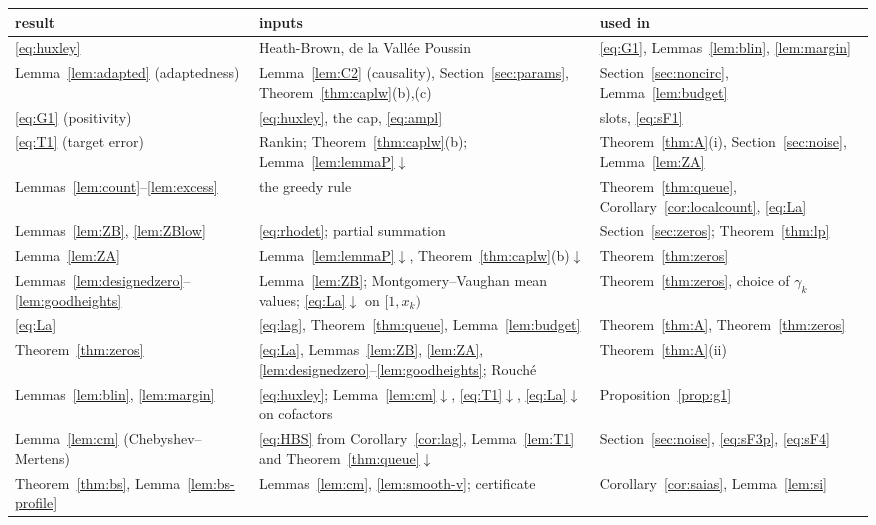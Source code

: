 \begin{center}\footnotesize
\begin{tabular}{@{}p{4.4cm}p{6.6cm}p{3.5cm}@{}}
\hline
result & inputs & used in \\ \hline
\eqref{eq:huxley} & Heath-Brown, de la Vall\'ee Poussin & \eqref{eq:G1}, Lemmas~\ref{lem:blin}, \ref{lem:margin} \\
Lemma~\ref{lem:adapted} (adaptedness) & Lemma~\ref{lem:C2} (causality), Section~\ref{sec:params}, Theorem~\ref{thm:caplw}(b),(c) & Section~\ref{sec:noncirc}, Lemma~\ref{lem:budget} \\
\eqref{eq:G1} (positivity) & \eqref{eq:huxley}, the cap, \eqref{eq:ampl} & slots, \ref{eq:sF1} \\
\eqref{eq:T1} (target error) & Rankin; Theorem~\ref{thm:caplw}(b); Lemma~\ref{lem:lemmaP}$\downarrow$ & Theorem~\ref{thm:A}(i), Section~\ref{sec:noise}, Lemma~\ref{lem:ZA} \\
Lemmas~\ref{lem:count}--\ref{lem:excess} & the greedy rule & Theorem~\ref{thm:queue}, Corollary~\ref{cor:localcount}, \eqref{eq:La} \\
Lemmas~\ref{lem:ZB}, \ref{lem:ZBlow} & \eqref{eq:rhodet}; partial summation & Section~\ref{sec:zeros}; Theorem~\ref{thm:lp} \\
Lemma~\ref{lem:ZA} & Lemma~\ref{lem:lemmaP}$\downarrow$, Theorem~\ref{thm:caplw}(b)$\downarrow$ & Theorem~\ref{thm:zeros} \\
Lemmas~\ref{lem:designedzero}--\ref{lem:goodheights} & Lemma~\ref{lem:ZB}; Montgomery--Vaughan mean values; \eqref{eq:La}$\downarrow$ on $[1,x_k)$ & Theorem~\ref{thm:zeros}, choice of $\gamma_k$ \\
\eqref{eq:La} & \eqref{eq:lag}, Theorem~\ref{thm:queue}, Lemma~\ref{lem:budget} & Theorem~\ref{thm:A}, Theorem~\ref{thm:zeros} \\
Theorem~\ref{thm:zeros} & \eqref{eq:La}, Lemmas~\ref{lem:ZB}, \ref{lem:ZA}, \ref{lem:designedzero}--\ref{lem:goodheights}; Rouch\'e & Theorem~\ref{thm:A}(ii) \\
Lemmas~\ref{lem:blin}, \ref{lem:margin} & \eqref{eq:huxley}; Lemma~\ref{lem:cm}$\downarrow$, \eqref{eq:T1}$\downarrow$, \eqref{eq:La}$\downarrow$ on cofactors & Proposition~\ref{prop:g1} \\
Lemma~\ref{lem:cm} (Chebyshev--Mertens) & \eqref{eq:HBS} from Corollary~\ref{cor:lag}, Lemma~\ref{lem:T1} and Theorem~\ref{thm:queue}$\downarrow$ & Section~\ref{sec:noise}, \ref{eq:sF3p}, \ref{eq:sF4} \\
Theorem~\ref{thm:bs}, Lemma~\ref{lem:bs-profile} & Lemmas~\ref{lem:cm}, \ref{lem:smooth-v}; certificate & Corollary~\ref{cor:saias}, Lemma~\ref{lem:si} \\

\end{tabular}
\end{center}
